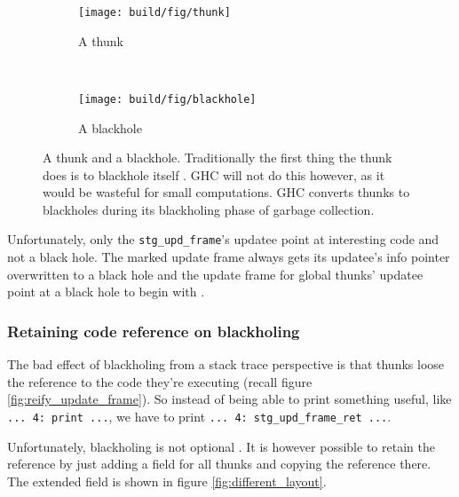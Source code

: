 \begin{figure}
\begin{mdframed}
  \begin{subfigure}[t]{0.5\textwidth}
    \texttt{[image: build/fig/thunk]}
    \caption{A thunk}
  \end{subfigure}
        ~ %
  \begin{subfigure}[t]{0.5\textwidth}
    \texttt{[image: build/fig/blackhole]}
    \caption{A blackhole}
  \end{subfigure}
  \caption{A thunk and a blackhole. Traditionally the first thing the
  thunk does is to blackhole itself %
  . GHC will not do this however, as it would be wasteful for small
  computations. GHC converts thunks to blackholes during its blackholing
  phase of garbage collection.
}\label{fig:thunks_and_blackholes}
\end{mdframed}
\end{figure}


Unfortunately, only the \texttt{stg\_upd\_frame}'s updatee point
at interesting code and not a black hole. The marked update frame
always gets its updatee's info pointer overwritten to a black
hole \cite{github_overwrite_blackhole} and the update frame
for global thunks' updatee point at a black hole to begin with
\cite{github_set_hdr_caf_blackhole}.

\subsubsection{Retaining code reference on blackholing}

The bad effect of blackholing from a stack trace perspective is
that thunks loose the reference to the code they're executing (recall figure \ref{fig:reify_update_frame}). So instead
of being able to print something useful, like  \texttt{... 4: print ...},
we have to print \texttt{... 4: stg\_upd\_frame\_ret ...}.

Unfortunately, blackholing is not optional
\cite{github_blackholing_not_optional}. It is however possible to
retain the reference by just adding a field for all thunks and
copying the reference there. The extended field is shown in figure
\ref{fig:different_layout}.

\begin{figure}
\end{figure}


